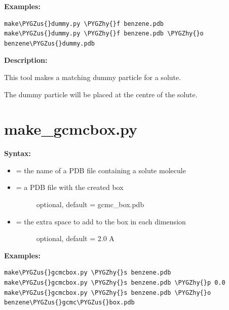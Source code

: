 \documentclass[letterpaper,10pt,english]{sphinxmanual}
\def\PYGZus{\char`\_}
\def\PYGZhy{\char`\-}
\begin{document}
\textbf{Examples:}

\begin{Verbatim}[frame=single,commandchars=\\\{\}]
make\PYGZus{}dummy.py \PYGZhy{}f benzene.pdb
make\PYGZus{}dummy.py \PYGZhy{}f benzene.pdb \PYGZhy{}o benzene\PYGZus{}dummy.pdb
\end{Verbatim}

\textbf{Description:}

This tool makes a matching dummy particle for a solute.

The dummy particle will be placed at the centre of the solute.


\section{make\_gcmcbox.py}
\label{tools:make-gcmcbox-py}
\textbf{Syntax:}

\begin{itemize}
\item {} 
 = the name of a PDB file containing a solute molecule

\item {} \begin{description}
\item[{ = a PDB file with the created box}] \leavevmode
optional, default = gcmc\_box.pdb

\end{description}

\item {} \begin{description}
\item[{ = the extra space to add to the box in each dimension}] \leavevmode
optional, default = 2.0 A

\end{description}

\end{itemize}

\textbf{Examples:}

\begin{Verbatim}[frame=single,commandchars=\\\{\}]
make\PYGZus{}gcmcbox.py \PYGZhy{}s benzene.pdb
make\PYGZus{}gcmcbox.py \PYGZhy{}s benzene.pdb \PYGZhy{}p 0.0
make\PYGZus{}gcmcbox.py \PYGZhy{}s benzene.pdb \PYGZhy{}o benzene\PYGZus{}gcmc\PYGZus{}box.pdb
\end{Verbatim}
\end{document}
